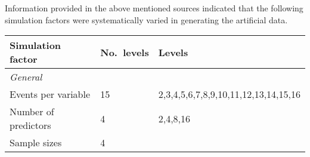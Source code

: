 \documentclass[10,a4paperpaper,]{article}
\begin{document}
Information provided in the above mentioned sources indicated that the
following simulation factors were systematically varied in generating
the artificial data.

\begin{longtable}[]{@{}lll@{}}
\toprule
\begin{minipage}[b]{0.37\columnwidth}\raggedright
Simulation factor\strut
\end{minipage} & \begin{minipage}[b]{0.12\columnwidth}\raggedright
No.~levels\strut
\end{minipage} & \begin{minipage}[b]{0.43\columnwidth}\raggedright
Levels\strut
\end{minipage}\tabularnewline
\midrule
\endhead
\begin{minipage}[t]{0.37\columnwidth}\raggedright
\emph{General}\strut
\end{minipage} & \begin{minipage}[t]{0.12\columnwidth}\raggedright
\strut
\end{minipage} & \begin{minipage}[t]{0.43\columnwidth}\raggedright
\strut
\end{minipage}\tabularnewline
\begin{minipage}[t]{0.37\columnwidth}\raggedright
Events per variable\strut
\end{minipage} & \begin{minipage}[t]{0.12\columnwidth}\raggedright
15\strut
\end{minipage} & \begin{minipage}[t]{0.43\columnwidth}\raggedright
2,3,4,5,6,7,8,9,10,11,12,13,14,15,16\strut
\end{minipage}\tabularnewline
\begin{minipage}[t]{0.37\columnwidth}\raggedright
Number of predictors\strut
\end{minipage} & \begin{minipage}[t]{0.12\columnwidth}\raggedright
4\strut
\end{minipage} & \begin{minipage}[t]{0.43\columnwidth}\raggedright
2,4,8,16\strut
\end{minipage}\tabularnewline
\begin{minipage}[t]{0.37\columnwidth}\raggedright
Sample sizes\strut
\end{minipage} & \begin{minipage}[t]{0.12\columnwidth}\raggedright
4\strut
\end{minipage} & \begin{minipage}[t]{0.43\columnwidth}\raggedright

\end{minipage}
\end{longtable}
\end{document}

